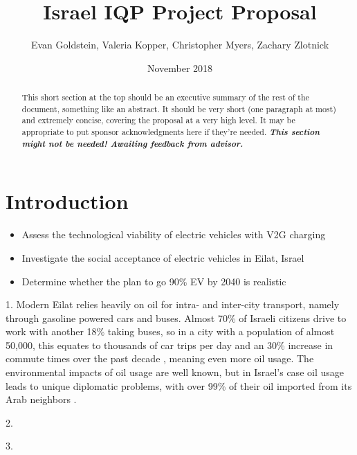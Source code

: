 \documentclass{report}                         %
\title{Israel IQP Project Proposal}
\author{Evan Goldstein, Valeria Kopper, Christopher Myers, Zachary Zlotnick}
\date{November 2018}
\begin{document}
\maketitle

\renewcommand\abstractname{Summary} %
\begin{abstract}
This short section at the top should be an executive summary of the rest of the document, something like an abstract. It should be very short (one paragraph at most) and extremely concise, covering the proposal at a very high level. It may be appropriate to put sponsor acknowledgments here if they're needed. \textbf{\textit{This section might not be needed! Awaiting feedback from advisor.}}
\end{abstract}

\tableofcontents
\newpage
{}

\doublespacing

\chapter{Introduction}



\begin{itemize}
    \item Assess the technological viability of electric vehicles with V2G charging
    \item Investigate the social acceptance of electric vehicles in Eilat, Israel
    \item Determine whether the plan to go 90\% EV by 2040 is realistic
\end{itemize}



1. Modern Eilat relies heavily on oil for intra- and inter-city transport, namely through gasoline powered cars and buses. Almost 70\% of Israeli citizens drive to work with another 18\% taking buses, so in a city with a population of almost 50,000, this equates to thousands of car trips per day and an 30\% increase in commute times over the past decade \cite{Dori2018IsraeliRoads}, meaning even more oil usage. The environmental impacts of oil usage are well known, but in Israel's case oil usage leads to unique diplomatic problems, with over 99\% of their oil imported from its Arab neighbors \cite{Engber2006WhereOil}. 

2. 

3.
\end{document}
